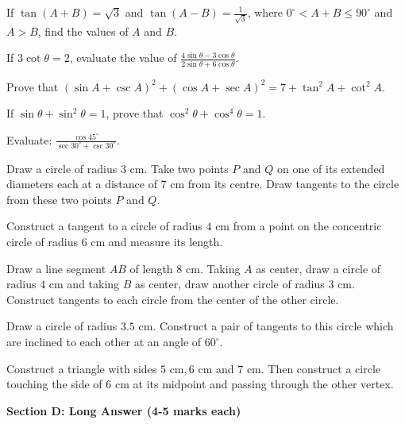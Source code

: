\documentclass[12pt,a4paper]{exam}
\begin{document}
\begin{questions}
\question[3] If $\tan(A+B) = \sqrt{3}$ and $\tan(A-B) = \frac{1}{\sqrt{3}}$, where $0^\circ < A+B \le 90^\circ$ and $A > B$, find the values of $A$ and $B$.
\vspace{0.15cm}

\question[3] If $3\cot \theta = 2$, evaluate the value of $\frac{4\sin \theta - 3\cos \theta}{2\sin \theta + 6\cos \theta}$.
\vspace{0.15cm}

\question[3] Prove that $(\sin A + \csc A)^2 + (\cos A + \sec A)^2 = 7 + \tan^2 A + \cot^2 A$.
\vspace{0.15cm}

\question[3] If $\sin \theta + \sin^2 \theta = 1$, prove that $\cos^2 \theta + \cos^4 \theta = 1$.
\vspace{0.15cm}

\question[3] Evaluate: $\frac{\cos 45^\circ}{\sec 30^\circ + \csc 30^\circ}$.
\vspace{0.15cm}

\question[3] Draw a circle of radius $3 \text{ cm}$. Take two points $P$ and $Q$ on one of its extended diameters each at a distance of $7 \text{ cm}$ from its centre. Draw tangents to the circle from these two points $P$ and $Q$.
\vspace{0.15cm}

\question[3] Construct a tangent to a circle of radius $4 \text{ cm}$ from a point on the concentric circle of radius $6 \text{ cm}$ and measure its length.
\vspace{0.15cm}

\question[3] Draw a line segment $AB$ of length $8 \text{ cm}$. Taking $A$ as center, draw a circle of radius $4 \text{ cm}$ and taking $B$ as center, draw another circle of radius $3 \text{ cm}$. Construct tangents to each circle from the center of the other circle.
\vspace{0.15cm}

\question[3] Draw a circle of radius $3.5 \text{ cm}$. Construct a pair of tangents to this circle which are inclined to each other at an angle of $60^\circ$.
\vspace{0.15cm}

\question[3] Construct a triangle with sides $5 \text{ cm}, 6 \text{ cm}$ and $7 \text{ cm}$. Then construct a circle touching the side of $6 \text{ cm}$ at its midpoint and passing through the other vertex.
\vspace{0.15cm}

\end{questions}
\bigskip
\noindent\textbf{\large Section D: Long Answer (4-5 marks each)}
\end{document}
